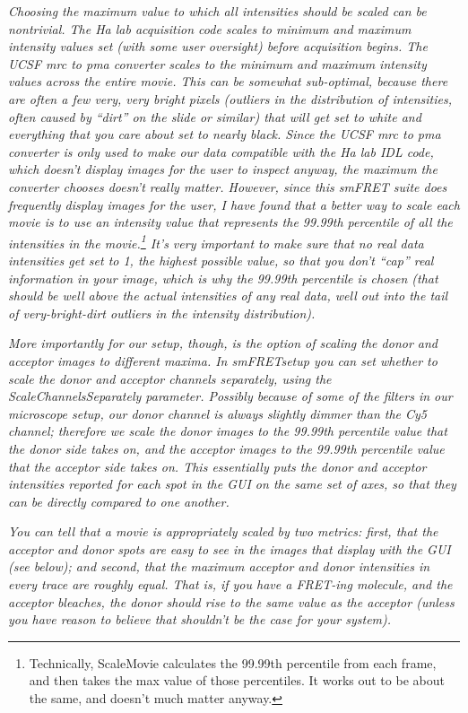 \documentclass[11pt]{article}
\begin{document}
{\it Choosing the maximum value to which all intensities should be scaled can be nontrivial. The Ha lab acquisition code scales to minimum and maximum intensity values set (with some user oversight) before acquisition begins.  The UCSF mrc to pma converter scales to the minimum and maximum intensity values across the entire movie.  This can be somewhat sub-optimal, because there are often a few very, very bright pixels (outliers in the distribution of intensities, often caused by ``dirt'' on the slide or similar) that will get set to white and everything that you care about set to nearly black.  Since the UCSF mrc to pma converter is only used to make our data compatible with the Ha lab IDL code, which doesn't display images for the user to inspect anyway, the maximum the converter chooses doesn't really matter.  However, since this smFRET suite does frequently display images for the user, I have found that a better way to scale each movie is to use an intensity value that represents the 99.99th percentile of all the intensities in the movie.\footnote{Technically, ScaleMovie calculates the 99.99th percentile from each frame, and then takes the max value of those percentiles.  It works out to be about the same, and doesn't much matter anyway.}  It's very important to make sure that no real data intensities get set to 1, the highest possible value, so that you don't ``cap'' real information in your image, which is why the 99.99th percentile is chosen (that should be well above the actual intensities of any real data, well out into the tail of very-bright-dirt outliers in the intensity distribution).}

{\it More importantly for our setup, though, is the option of scaling the donor and acceptor images to different maxima.  In smFRETsetup you can set whether to scale the donor and acceptor channels separately, using the ScaleChannelsSeparately parameter.  Possibly because of some of the filters in our microscope setup, our donor channel is always slightly dimmer than the Cy5 channel; therefore we scale the donor images to the 99.99th percentile value that the donor side takes on, and the acceptor images to the 99.99th percentile value that the acceptor side takes on.  This essentially puts the donor and acceptor intensities reported for each spot in the GUI on the same set of axes, so that they can be directly compared to one another.  }

{\it You can tell that a movie is appropriately scaled by two metrics: first, that the acceptor and donor spots are easy to see in the images that display with the GUI (see below); and second, that the maximum acceptor and donor intensities in every trace are roughly equal.  That is, if you have a FRET-ing molecule, and the acceptor bleaches, the donor should rise to the same value as the acceptor (unless you have reason to believe that shouldn't be the case for your system).}
\end{document}

